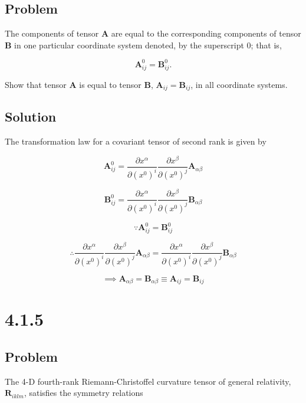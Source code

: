 \documentclass[12pt]{article}
\begin{document}
\subsection{Problem}

The components of tensor \textbf{A} are equal to the corresponding components
of tensor \textbf{B} in one particular coordinate system denoted, by the
superscript 0; that is,

\[
    \textbf{A}^0_{ij} = \textbf{B}^0_{ij}.
\]

Show that tensor \textbf{A} is equal to tensor \textbf{B},
\(\textbf{A}_{ij} = \textbf{B}_{ij}\), in all coordinate systems.

\subsection{Solution}

The transformation law for a covariant tensor of second rank is given by

\[
    \textbf{A}^0_{ij} =
    \frac{\partial x^\alpha}{\partial {\left(x^0\right)}^i}
    \frac{\partial x^\beta}{\partial {\left(x^0\right)}^j}
    \textbf{A}_{\alpha \beta}
\]

\[
    \textbf{B}^0_{ij} =
    \frac{\partial x^\alpha}{\partial {\left(x^0\right)}^i}
    \frac{\partial x^\beta}{\partial {\left(x^0\right)}^j}
    \textbf{B}_{\alpha \beta}
\]

\[
    \because \textbf{A}^0_{ij} = \textbf{B}^0_{ij}
\]

\[
    \therefore
    \frac{\partial x^\alpha}{\partial {\left(x^0\right)}^i}
    \frac{\partial x^\beta}{\partial {\left(x^0\right)}^j}
    \textbf{A}_{\alpha \beta} =
    \frac{\partial x^\alpha}{\partial {\left(x^0\right)}^i}
    \frac{\partial x^\beta}{\partial {\left(x^0\right)}^j}
    \textbf{B}_{\alpha \beta}
\]

\[
    \implies \textbf{A}_{\alpha \beta} = \textbf{B}_{\alpha \beta} \equiv
    \textbf{A}_{ij} = \textbf{B}_{ij}
\]

\newpage
\section{4.1.5}

\subsection{Problem}

The 4-D fourth-rank Riemann-Christoffel curvature tensor of general relativity,
\(\textbf{R}_{iklm}\), satisfies the symmetry relations
\end{document}
